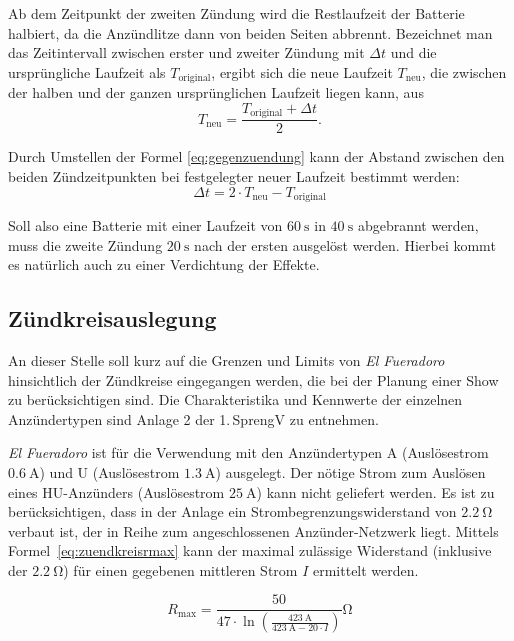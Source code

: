 \documentclass[paper=a4, parskip, numbers=noenddot, toc=listof, headsepline]{scrbook}
\newcommand{\anlage}{\emph{El Fueradoro}}
\begin{document}
					Ab dem Zeitpunkt der zweiten Zündung wird die Restlaufzeit der Batterie halbiert, da die Anzündlitze dann von beiden Seiten abbrennt. Bezeichnet man das Zeitintervall zwischen erster und zweiter Zündung mit ${\Delta}t$ und die ursprüngliche Laufzeit als $T_\text{original}$, ergibt sich die neue Laufzeit $T_\text{neu}$, die zwischen der halben und der ganzen ursprünglichen Laufzeit liegen kann, aus
					\begin{equation}
						T_\text{neu} = \frac{T_\text{original} + {\Delta}t}{2}.
						\label{eq:gegenzuendung}
					\end{equation}

					Durch Umstellen der Formel \eqref{eq:gegenzuendung} kann der Abstand zwischen den beiden Zündzeitpunkten bei festgelegter neuer Laufzeit bestimmt werden:
					\begin{equation}
						{\Delta}t = 2 {\cdot} T_\text{neu} - T_\text{original}
					\end{equation}

					Soll also eine Batterie mit einer Laufzeit von $\SI{60}{\second}$ in $\SI{40}{\second}$ abgebrannt werden, muss die zweite Zündung $\SI{20}{\second}$ nach der ersten ausgelöst werden. Hierbei kommt es natürlich auch zu einer Verdichtung der Effekte.

				\subsection{Zündkreisauslegung}

					An dieser Stelle soll kurz auf die Grenzen und Limits von {\anlage} hinsichtlich der Zündkreise eingegangen werden, die bei der Planung einer Show zu berücksichtigen sind. Die Charakteristika und Kennwerte der einzelnen Anzündertypen sind Anlage 2 der 1.\,SprengV zu entnehmen.

					{\anlage} ist für die Verwendung mit den Anzündertypen A (Auslösestrom $\SI{0,6}{\ampere}$) und U (Auslösestrom $\SI{1,3}{\ampere}$) ausgelegt. Der nötige Strom zum Auslösen eines HU-Anzünders (Auslösestrom $\SI{25}{\ampere}$) kann nicht geliefert werden. Es ist zu berücksichtigen, dass in der Anlage ein Strombegrenzungswiderstand von $\SI{2,2}{\ohm}$ verbaut ist, der in Reihe zum angeschlossenen Anzünder-Netzwerk liegt. Mittels Formel~\eqref{eq:zuendkreisrmax} kann der maximal zulässige Widerstand (inklusive der $\SI{2,2}{\ohm}$) für einen gegebenen mittleren Strom $I$ ermittelt werden.

					\begin{equation}
						R_\text{max} = \frac{50}{47 {\cdot} \ln\left(\frac{\SI{423}{\ampere}}{\SI{423}{\ampere} - 20 {\cdot} I}\right)}\si{\ohm}
						\label{eq:zuendkreisrmax}
					\end{equation}
\end{document}
